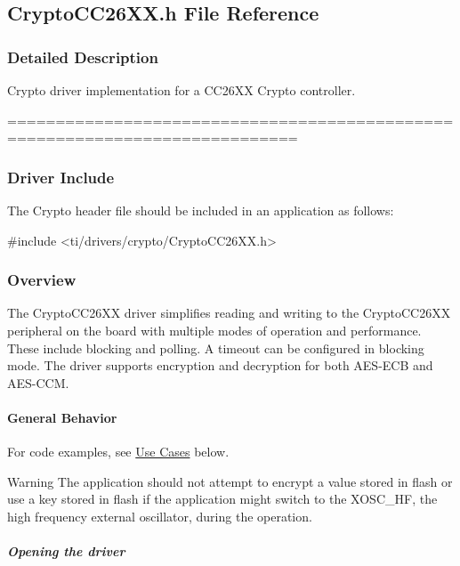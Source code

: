 \subsection{Crypto\+C\+C26\+X\+X.\+h File Reference}
\label{_crypto_c_c26_x_x_8h}


\subsubsection{Detailed Description}
Crypto driver implementation for a C\+C26\+X\+X Crypto controller. 

============================================================================

\subsubsection*{Driver Include}

The Crypto header file should be included in an application as follows\+: 
\begin{DoxyCode}
\textcolor{preprocessor}{#include <ti/drivers/crypto/CryptoCC26XX.h>}
\end{DoxyCode}


\subsubsection*{Overview}

The Crypto\+C\+C26\+X\+X driver simplifies reading and writing to the Crypto\+C\+C26\+X\+X peripheral on the board with multiple modes of operation and performance. These include blocking and polling. A timeout can be configured in blocking mode. The driver supports encryption and decryption for both A\+E\+S-\/\+E\+C\+B and A\+E\+S-\/\+C\+C\+M.

\paragraph*{General Behavior}

For code examples, see \hyperlink{_crypto_c_c26_x_x_8h_CRYPTO_USE_CASES}{Use Cases} below.

\begin{DoxyWarning}{Warning}
The application should not attempt to encrypt a value stored in flash or use a key stored in flash if the application might switch to the X\+O\+S\+C\+\_\+\+H\+F, the high frequency external oscillator, during the operation.
\end{DoxyWarning}
\subparagraph*{Opening the driver}


